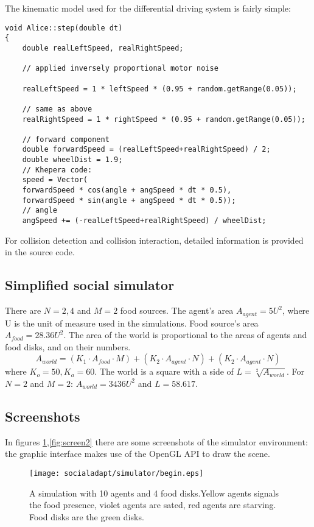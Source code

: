 The kinematic model used for the differential driving system is fairly simple:
\small{
\begin{lstlisting}
void Alice::step(double dt)
{
	double realLeftSpeed, realRightSpeed;
		
	// applied inversely proportional motor noise 

	realLeftSpeed = 1 * leftSpeed * (0.95 + random.getRange(0.05));

	// same as above
	realRightSpeed = 1 * rightSpeed * (0.95 + random.getRange(0.05));

	// forward component
	double forwardSpeed = (realLeftSpeed+realRightSpeed) / 2;
	double wheelDist = 1.9;
	// Khepera code:
	speed = Vector(
	forwardSpeed * cos(angle + angSpeed * dt * 0.5),
	forwardSpeed * sin(angle + angSpeed * dt * 0.5));
	// angle
	angSpeed += (-realLeftSpeed+realRightSpeed) / wheelDist;	
\end{lstlisting}
}

For collision detection and collision interaction, detailed information
is provided in the source code.

\subsection{Simplified social simulator}
\label{Appendix:simplesocialsim}
There are $N=2,4$ and $M=2$ food sources.
The agent's area $A_{agent}=5 U^{2}$, where U is the unit of measure used in the simulations.
Food source's area $A_{food}=28.36 U^2$.
The area of the world is proportional to the areas of agents and food disks, and on their numbers.
\begin{equation}
A_{world}=(K_{1} \cdot A_{food} \cdot M) + (K_{2} \cdot A_{agent} \cdot N) + (K_{2} \cdot A_{agent} \cdot N)
\end{equation}
where $K_{o}=50,K_{a}=60$. The world is a square with a side of $L=\sqrt[2]{A_{world}}$.
For $N=2$ and $M=2$: $A_{world}=3436 U^2$ and $L=58.617$.

\subsection{Screenshots}
In figures \ref{fig:screen1},\ref{fig:screen2} there are some screenshots of
the simulator environment: the graphic interface makes use of the OpenGL API
to draw the scene.

\begin{figure}[htb]
\begin{centering}
\texttt{[image: socialadapt/simulator/begin.eps]}
\small{
\caption[Software simulation in Enki A]{A simulation with 10 agents and 4 food disks.Yellow agents signals the
food presence, violet agents are sated, red agents are starving.
Food disks are the green disks. \label{fig:screen1}}
}
\end{centering}
\end{figure}

